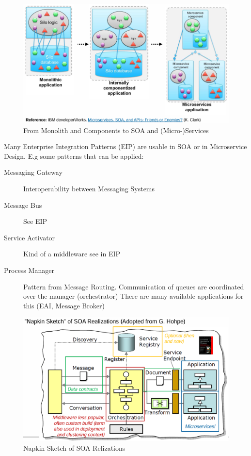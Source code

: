 \documentclass[../Main.tex]{subfiles}
\begin{document}
\begin{figure}[H]
    \centering
    \includegraphics[width=0.75\linewidth]{Images/ibm-microservices.png}
    \caption{From Monolith and Components to SOA and (Micro-)Services}
\end{figure}

Many Enterprise Integration Patterns (EIP) are usable in SOA or in Microservice Design.
E.g some patterns that can be applied:
\begin{description}
    \item[Messaging Gateway] Interoperability between Messaging Systems
    \item[Message Bus] See EIP
    \item[Service Activator] Kind of a middleware see in EIP
    \item[Process Manager] Pattern from Message Routing. Communication of queues are coordinated over the manager (orchestrator)
    There are many available applications for this (EAI, Message Broker)
\end{description}

\begin{figure}[H]
    \centering
    \includegraphics[width=1\linewidth]{Images/napkin-soa.png}
    \caption{Napkin Sketch of SOA Relizations}
\end{figure}
\end{document}
